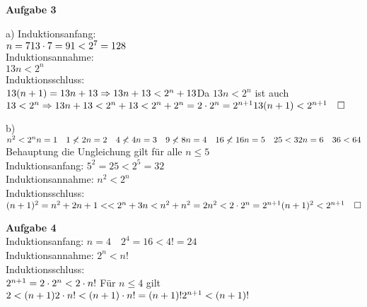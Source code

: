 \documentclass{scrartcl}
\begin{document}
\textbf{Aufgabe 3}
\begin{description}
\item{a)}
Induktionsanfang:\\
$n=7\\
13\cdot 7 = 91 < 2^7 = 128$\\
Induktionsannahme:\\
$13n<2^n$\\
Induktionsschluss:\\
$13(n+1) = 13n + 13\\
\Rightarrow 13n + 13 < 2^n + 13\\
$Da $13n<2^n$ ist auch $13 < 2^n\\
\Rightarrow 13n+13<2^n+13<2^n+2^n=2\cdot 2^n=2^{n+1}\\
13(n+1)<2^{n+1} \quad \square$
\item{b)}
$n^2<2^n\\
n=1 \quad  1\not< 2\\
n=2 \quad 4\not<4\\
n=3 \quad 9\not<8\\
n=4 \quad 16\not<16\\
n=5 \quad 25<32\\
n=6 \quad 36<64$\\
Behauptung die Ungleichung gilt für alle $n\le5$\\
Induktionsanfang: $5^2 = 25 < 2^5 = 32$\\
Induktionsannahme: $n^2<2^n$\\
Induktionsschluss:\\
$(n+1)^{2}=n^2+2n+1<<2^n+3n<n^2+n^2=2n^2<2\cdot2^n=2^{n+1}\\
(n+1)^2<2^{n+1} \quad\square$
\end{description}
\textbf{Aufgabe 4}\\
Induktionsanfang: $n=4\quad 2^4=16 < 4! = 24$\\
Induktionsannahme: $2^n<n!$\\
Induktionsschluss:\\
$2^{n+1}=2\cdot 2^n < 2\cdot n!\\$
Für $n\le4$ gilt $2<(n+1)\\
2\cdot n! < (n+1)\cdot n! = (n+1)! \\
2^{n+1}<(n+1)!$
\end{document}
